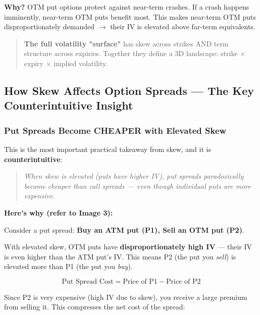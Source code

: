 \documentclass[12pt,openany]{book}
\begin{document}
\textbf{Why?} OTM put options protect against near-term crashes. If a crash happens imminently, near-term OTM puts benefit most. This makes near-term OTM puts disproportionately demanded \(\rightarrow\) their IV is elevated above far-term equivalents.

\begin{quote}
\textbf{The full volatility "surface"} has skew across strikes AND term structure across expiries. Together they define a 3D landscape: strike \(\times\) expiry \(\times\) implied volatility.
\end{quote}

\subsection{How Skew Affects Option Spreads — The Key Counterintuitive Insight}

\subsubsection{Put Spreads Become CHEAPER with Elevated Skew}

This is the most important practical takeaway from skew, and it is \textbf{counterintuitive}:

\begin{quote}
\emph{When skew is elevated (puts have higher IV), put spreads paradoxically become }\emph{cheaper}\emph{ than call spreads — even though individual puts are more expensive.}
\end{quote}

\textbf{Here's why (refer to Image 3):}

Consider a put spread: \textbf{Buy an ATM put (P1), Sell an OTM put (P2)}.

With elevated skew, OTM puts have \textbf{disproportionately high IV} — their IV is even higher than the ATM put's IV. This means P2 (the put you \emph{sell}) is elevated more than P1 (the put you \emph{buy}).

\[
\text{Put Spread Cost} = \text{Price of P1} - \text{Price of P2}
\]

Since P2 is very expensive (high IV due to skew), you receive a large premium from selling it. This compresses the net cost of the spread:


\begin{center}
\end{center}
\end{document}
